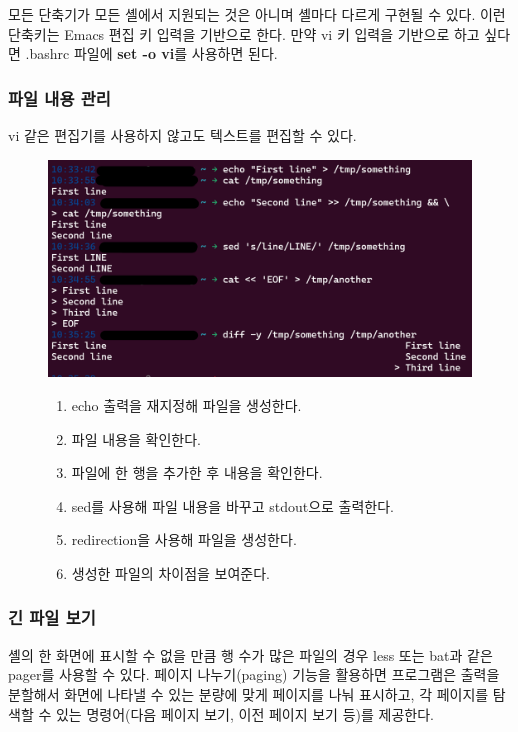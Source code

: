 \begin{flushleft}
    모든 단축기가 모든 셸에서 지원되는 것은 아니며 셸마다 다르게 구현될 수 있다.
    이런 단축키는 Emacs 편집 키 입력을 기반으로 한다.
    만약 vi 키 입력을 기반으로 하고 싶다면 .bashrc 파일에 \textbf{set -o vi}를 사용하면 된다.
\end{flushleft}

\subsubsection*{파일 내용 관리}
\begin{flushleft}
    vi 같은 편집기를 사용하지 않고도 텍스트를 편집할 수 있다.
\end{flushleft}

\begin{figure}
    \includegraphics[width=15cm]{resource/3-file-management.png}
    \begin{enumerate}
        \item echo 출력을 재지정해 파일을 생성한다.
        \item 파일 내용을 확인한다.
        \item 파일에 한 행을 추가한 후 내용을 확인한다.
        \item sed를 사용해 파일 내용을 바꾸고 stdout으로 출력한다.
        \item redirection을 사용해 파일을 생성한다.
        \item 생성한 파일의 차이점을 보여준다.
    \end{enumerate}
\end{figure}


\subsubsection*{긴 파일 보기}
\begin{flushleft}
    셸의 한 화면에 표시할 수 없을 만큼 행 수가 많은 파일의 경우
    less 또는 bat과 같은 pager를 사용할 수 있다.
    페이지 나누기(paging) 기능을 활용하면 프로그램은 출력을 분할해서
    화면에 나타낼 수 있는 분량에 맞게 페이지를 나눠 표시하고,
    각 페이지를 탐색할 수 있는 명령어(다음 페이지 보기, 이전 페이지 보기 등)를 제공한다.
\end{flushleft}

